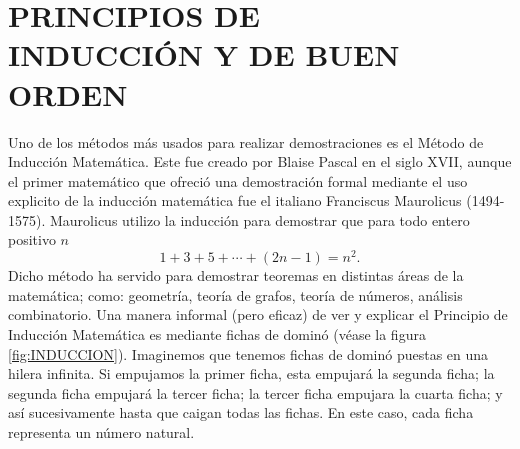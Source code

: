 \chapter[PRINCIPIOS DE INDUCCIÓN Y DE BUEN ORDEN]{PRINCIPIOS DE \\ INDUCCIÓN Y DE BUEN ORDEN}\label{sec:induction}

Uno de los métodos más usados para realizar demostraciones es el Método de Inducción Matemática. Este fue creado por Blaise Pascal en el siglo XVII, aunque el primer matemático que ofreció una demostración formal mediante el uso explicito de la inducción matemática fue el italiano Franciscus Maurolicus (1494-1575). Maurolicus utilizo la inducción para demostrar que para todo entero positivo $n$
$$1 + 3 + 5 + \cdots + (2n-1) = n^2.$$
Dicho método ha servido para demostrar teoremas en distintas áreas de la matemática; como: geometría, teoría de grafos, teoría de números, análisis combinatorio. Una manera informal (pero eficaz) de ver y explicar el Principio de Inducción Matemática es mediante fichas de dominó (véase la figura \ref{fig:INDUCCION}). Imaginemos que tenemos fichas de dominó puestas en una hilera infinita. Si empujamos la primer ficha, esta empujará la segunda ficha; la segunda ficha empujará la tercer ficha; la tercer ficha empujara la cuarta ficha; y así sucesivamente hasta que caigan todas las fichas. En este caso, cada ficha representa un número natural.

